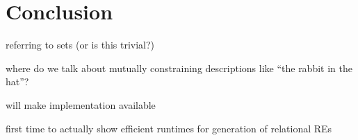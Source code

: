 \section{Conclusion} \label{sec:conclusion}

referring to sets (or is this trivial?)

where do we talk about mutually constraining descriptions like ``the
rabbit in the hat''?

will make implementation available

first time to actually show efficient runtimes for generation of
relational REs

